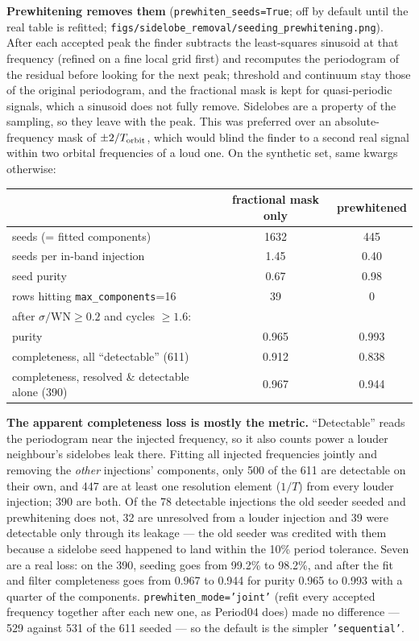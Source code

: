 \documentclass[11pt]{article}
\newcommand{\code}[1]{\texttt{#1}}
\begin{document}
\textbf{Prewhitening removes them} (\code{prewhiten\_seeds=True}; off by default until the
real table is refitted; \code{figs/sidelobe\_removal/seeding\_prewhitening.png}). After each
accepted peak the finder subtracts the least-squares sinusoid at that frequency (refined on a
fine local grid first) and recomputes the periodogram of the residual before looking for the
next peak; threshold and continuum stay those of the original periodogram, and the
fractional mask is kept for quasi-periodic signals, which a sinusoid does not fully remove.
Sidelobes are a property of the sampling, so they leave with the peak. This was preferred
over an absolute-frequency mask of $\pm 2/T_{\rm orbit}$, which would blind the finder to a
second real signal within two orbital frequencies of a loud one. On the synthetic set, same
kwargs otherwise:

\begin{center}
\begin{tabular}{lcc}
\toprule
 & fractional mask only & prewhitened \\
\midrule
seeds (= fitted components)               & 1632 & 445 \\
seeds per in-band injection               & 1.45 & 0.40 \\
seed purity                               & 0.67 & 0.98 \\
rows hitting \code{max\_components}=16     & 39 & 0 \\
\midrule
\multicolumn{3}{l}{after $\sigma/\mathrm{WN} \ge 0.2$ and cycles $\ge 1.6$:} \\
\quad purity                              & 0.965 & 0.993 \\
\quad completeness, all ``detectable'' (611)            & 0.912 & 0.838 \\
\quad completeness, resolved \& detectable alone (390)  & 0.967 & 0.944 \\
\bottomrule
\end{tabular}
\end{center}

\textbf{The apparent completeness loss is mostly the metric.} ``Detectable'' reads the
periodogram near the injected frequency, so it also counts power a louder neighbour's
sidelobes leak there. Fitting all injected frequencies jointly and removing the
\emph{other} injections' components, only 500 of the 611 are detectable on their own, and
447 are at least one resolution element ($1/T$) from every louder injection; 390 are both.
Of the 78 detectable injections the old seeder seeded and prewhitening does not, 32 are
unresolved from a louder injection and 39 were detectable only through its leakage --- the
old seeder was credited with them because a sidelobe seed happened to land within the 10\%
period tolerance. Seven are a real loss: on the 390, seeding goes from 99.2\% to 98.2\%, and
after the fit and filter completeness goes from 0.967 to 0.944 for purity 0.965 to 0.993
with a quarter of the components. \code{prewhiten\_mode='joint'} (refit every accepted
frequency together after each new one, as Period04 does) made no difference --- 529 against
531 of the 611 seeded --- so the default is the simpler \code{'sequential'}.
\end{document}
